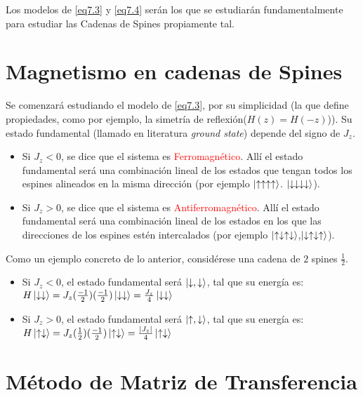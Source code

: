 \documentclass{book}
\begin{document}
Los modelos de \ref{eq7.3} y \ref{eq7.4} serán los que se estudiarán fundamentalmente para estudiar las Cadenas de Spines propiamente tal. 


\section{Magnetismo en cadenas de Spines} 

Se comenzará estudiando el modelo de \ref{eq7.3}, por su simplicidad (la que define propiedades, como por ejemplo, la simetría de reflexión($H(z)=H(-z)$)). Su estado fundamental (llamado en literatura \textit{ground state}) depende del signo de $J_z$.

\begin{itemize}
    \item Si $J_z <0$, se dice que el sistema es \textcolor{red}{Ferromagnético}. Allí el estado fundamental será una combinación lineal de los estados que tengan todos los espines alineados en la misma dirección (por ejemplo $\ket{\uparrow\uparrow\uparrow\uparrow}$. $\ket{\downarrow\downarrow\downarrow\downarrow}$).
    \item Si $J_z >0$, se dice que el sistema es \textcolor{red}{Antiferromagnético}. Allí el estado fundamental será una combinación lineal de los estados en los que las direcciones de los espines estén intercalados (por ejemplo $\ket{\uparrow\downarrow\uparrow\downarrow}$,$\ket{\downarrow\uparrow\downarrow\uparrow}$).
\end{itemize}
    
Como un ejemplo concreto de lo anterior, considérese una cadena de $2$ spines $\frac{1}{2}$.

\begin{itemize}
    \item Si $J_z <0$, el estado fundamental será $\ket{\downarrow,\downarrow}$, tal que su energía es: $H\ket{\downarrow\downarrow}=J_z(\frac{-1}{2})(\frac{-1}{2})\ket{\downarrow\downarrow}=\frac{J_z}{4}\ket{\downarrow\downarrow}$
    \item Si $J_z >0$, el estado fundamental será $\ket{\uparrow,\downarrow}$, tal que su energía es: $H\ket{\uparrow\downarrow}=J_z(\frac{1}{2})(\frac{-1}{2})\ket{\uparrow\downarrow}=\frac{\lvert J_z\rvert}{4}\ket{\uparrow\downarrow}$
\end{itemize}
\section{Método de Matriz de Transferencia}
\end{document}
